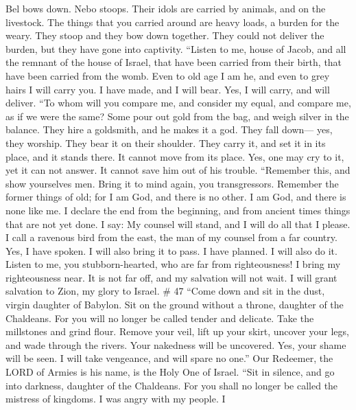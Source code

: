  Bel bows down. Nebo stoops. Their idols are carried by
animals, and on the livestock. The things that you carried around are
heavy loads, a burden for the weary.  They stoop and they
bow down together. They could not deliver the burden, but they have gone
into captivity.  ``Listen to me, house of Jacob, and all
the remnant of the house of Israel, that have been carried from their
birth, that have been carried from the womb.  Even to old
age I am he, and even to grey hairs I will carry you. I have made, and I
will bear. Yes, I will carry, and will deliver.  ``To whom
will you compare me, and consider my equal, and compare me, as if we
were the same?  Some pour out gold from the bag, and weigh
silver in the balance. They hire a goldsmith, and he makes it a god.
They fall down--- yes, they worship.  They bear it on
their shoulder. They carry it, and set it in its place, and it stands
there. It cannot move from its place. Yes, one may cry to it, yet it can
not answer. It cannot save him out of his trouble. 
``Remember this, and show yourselves men. Bring it to mind again, you
transgressors.  Remember the former things of old; for I
am God, and there is no other. I am God, and there is none like me.
 I declare the end from the beginning, and from ancient
times things that are not yet done. I say: My counsel will stand, and I
will do all that I please.  I call a ravenous bird from
the east, the man of my counsel from a far country. Yes, I have spoken.
I will also bring it to pass. I have planned. I will also do it.
 Listen to me, you stubborn-hearted, who are far from
righteousness!  I bring my righteousness near. It is not
far off, and my salvation will not wait. I will grant salvation to Zion,
my glory to Israel. \# 47  ``Come down and sit in the
dust, virgin daughter of Babylon. Sit on the ground without a throne,
daughter of the Chaldeans. For you will no longer be called tender and
delicate.  Take the millstones and grind flour. Remove
your veil, lift up your skirt, uncover your legs, and wade through the
rivers.  Your nakedness will be uncovered. Yes, your shame
will be seen. I will take vengeance, and will spare no one.''
 Our Redeemer, the LORD of Armies is his name, is the Holy
One of Israel.  ``Sit in silence, and go into darkness,
daughter of the Chaldeans. For you shall no longer be called the
mistress of kingdoms.  I was angry with my people. I
